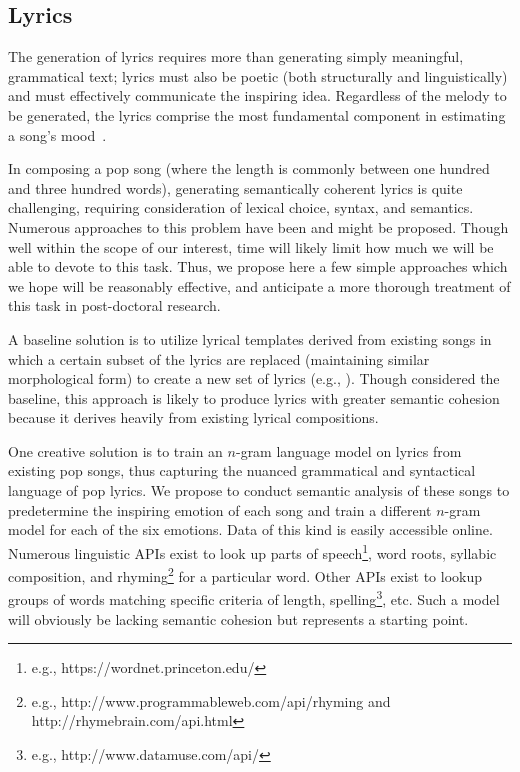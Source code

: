 \documentclass[11pt,phd]{byuprop}
\begin{document}
\subsection{Lyrics}

The generation of lyrics requires more than generating simply meaningful, grammatical text; lyrics must also be poetic (both structurally and linguistically) and must effectively communicate the inspiring idea. Regardless of the melody to be generated, the lyrics comprise the most fundamental component in estimating a song's mood~\cite{chi2009power}.

In composing a pop song (where the length is commonly between one hundred and three hundred words), generating semantically coherent lyrics is quite challenging, requiring consideration of lexical choice, syntax, and semantics. Numerous approaches to this problem have been and might be proposed. Though well within the scope of our interest, time will likely limit how much we will be able to devote to this task. Thus, we propose here a few simple approaches which we hope will be reasonably effective, and anticipate a more thorough treatment of this task in post-doctoral research.

A baseline solution is to utilize lyrical templates derived from existing songs in which a certain subset of the lyrics are replaced (maintaining similar morphological form) to create a new set of lyrics (e.g., \cite{toivanen2012corpus}). Though considered the baseline, this approach is likely to produce lyrics with greater semantic cohesion because it derives heavily from existing lyrical compositions.

One creative solution is to train an $n$-gram language model on lyrics from existing pop songs, thus capturing the nuanced grammatical and syntactical language of pop lyrics. We propose to conduct semantic analysis of these songs to predetermine the inspiring emotion of each song and train a different $n$-gram model for each of the six emotions. Data of this kind is easily accessible online. Numerous linguistic APIs exist to look up parts of speech\footnote{e.g., https://wordnet.princeton.edu/}, word roots, syllabic composition, and rhyming\footnote{e.g., http://www.programmableweb.com/api/rhyming and http://rhymebrain.com/api.html} for a particular word. Other APIs exist to lookup groups of words matching specific criteria of length, spelling\footnote{e.g., http://www.datamuse.com/api/}, etc. Such a model will obviously be lacking semantic cohesion but represents a starting point.
\end{document}
